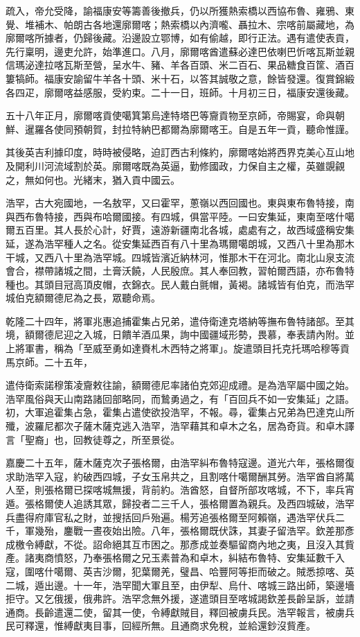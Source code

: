 \begin{pinyinscope}
疏入，帝允受降，諭福康安等籌善後撤兵，仍以所獲熱索橋以西協布魯、雍鴉、東覺、堆補木、帕朗古各地還廓爾喀；熱索橋以內濟嚨、聶拉木、宗喀前屬藏地，為廓爾喀所據者，仍歸後藏。沿邊設立鄂博，如有偷越，即行正法。遇有遣使表貢，先行稟明，邊吏允許，始準進口。八月，廓爾喀酋遣蘇必達巴依喇巴忻喀瓦斯並親信瑪泌達拉喀瓦斯至營，呈水牛、豬、羊各百頭、米二百石、果品糖食百筐、酒百簍犒師。福康安諭留牛羊各十頭、米十石，以答其誠敬之意，餘皆發還。復賞錦緞各四疋，廓爾喀益感服，受約束。二十一日，班師。十月初三日，福康安還後藏。

五十八年正月，廓爾喀貢使噶箕第烏達特塔巴等齎貢物至京師，帝賜宴，命與朝鮮、暹羅各使同預朝賀，封拉特納巴都爾為廓爾喀王。自是五年一貢，聽命惟謹。

其後英吉利據印度，時時被侵略，迫訂西古利條約，廓爾喀始將西界克美心互山地及開利川河流域割於英。廓爾喀既為英逼，勤修國政，力保自主之權，英雖覬覦之，無如何也。光緒末，猶入貢中國云。

浩罕，古大宛國地，一名敖罕，又曰霍罕，蔥嶺以西回國也。東與東布魯特接，南與西布魯特接，西與布哈爾國接。有四城，俱當平陸。一曰安集延，東南至喀什噶爾五百里。其人長於心計，好賈，遠游新疆南北各城，處處有之，故西域盛稱安集延，遂為浩罕種人之名。從安集延西百有八十里為瑪爾噶朗城，又西八十里為那木干城，又西八十里為浩罕城。四城皆濱近納林河，惟那木干在河北。南北山泉支流會合，襟帶諸城之間，土膏沃饒，人民殷庶。其人奉回教，習帕爾西語，亦布魯特種也。其頭目冠高頂皮帽，衣錦衣。民人戴白氈帽，黃褐。諸城皆有伯克，而浩罕城伯克額爾德尼為之長，眾聽命焉。

乾隆二十四年，將軍兆惠追捕霍集占兄弟，遣侍衛達克塔納等撫布魯特諸部。至其境，額爾德尼迎之入城，日饋羊酒瓜果，詢中國疆域形勢，畏慕，奉表請內附。並上將軍書，稱為「至威至勇如達賚札木西特之將軍」。旋遣頭目托克托瑪哈穆等貢馬京師。二十五年，

遣侍衛索諾穆策凌齎敕往諭，額爾德尼率諸伯克郊迎成禮。是為浩罕屬中國之始。浩罕風俗與天山南路諸回部略同，而鷙勇過之，有「百回兵不如一安集延」之語。初，大軍追霍集占急，霍集占遣使欲投浩罕，不報。尋，霍集占兄弟為巴達克山所殲，波羅尼都次子薩木薩克逃入浩罕，浩罕藉其和卓木之名，居為奇貨。和卓木譯言「聖裔」也，回教徒尊之，所至景從。

嘉慶二十五年，薩木薩克次子張格爾，由浩罕糾布魯特寇邊。道光六年，張格爾復求助浩罕入寇，約破西四城，子女玉帛共之，且割喀什噶爾酬其勞。浩罕酋自將萬人至，則張格爾已探喀城無援，背前約。浩酋怒，自督所部攻喀城，不下，率兵宵遁。張格爾使人追誘其眾，歸投者二三千人，張格爾置為親兵。及西四城破，浩罕兵盡得府庫官私之財，並搜括回戶殆遍。楊芳追張格爾至阿賴嶺，遇浩罕伏兵二千，軍幾殆，鏖戰一晝夜始出險。八年，張格爾既伏誅，其妻子留浩罕。欽差那彥成檄令縛獻，不從。詔命絕其互市困之。那彥成並奏驅留商內地之夷，且沒入其貲產。諸夷商憤怒，乃奉張格爾之兄玉素普為和卓木，糾結布魯特、安集延數千入寇，圍喀什噶爾、英吉沙爾，犯葉爾羌，璧昌、哈豐阿等拒而破之。賊悉掠喀、英二城，遁出邊。十一年，浩罕聞大軍且至，由伊犁、烏什、喀城三路出師，築邊墻拒守。又乞俄援，俄弗許。浩罕念無外援，遂遣頭目至喀城謁欽差長齡呈訴，並請通商。長齡遣還二使，留其一使，令縛獻賊目，釋回被虜兵民。浩罕報言，被虜兵民可釋還，惟縛獻夷目事，回經所無。且通商求免稅，並給還鈔沒貲產。


\end{pinyinscope}
